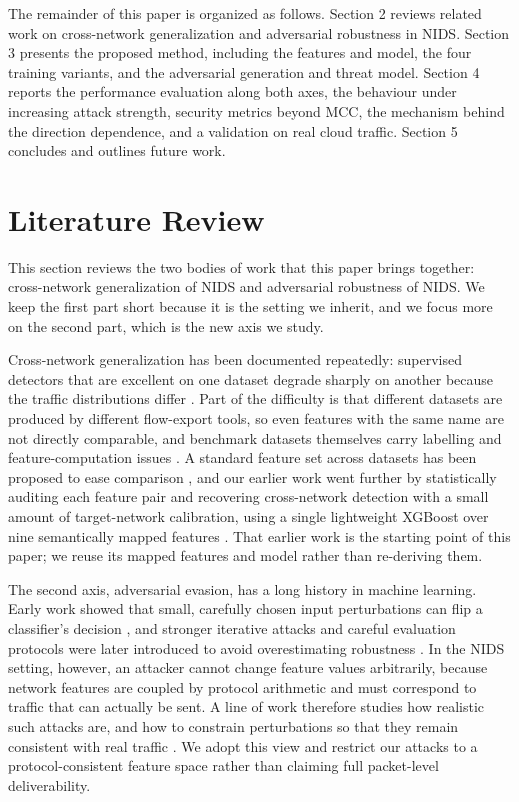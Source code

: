 \documentclass[11pt,a4paper]{article}
\begin{document}
The remainder of this paper is organized as follows. Section 2 reviews related work on
cross-network generalization and adversarial robustness in NIDS. Section 3 presents the
proposed method, including the features and model, the four training variants, and the
adversarial generation and threat model. Section 4 reports the performance evaluation
along both axes, the behaviour under increasing attack strength, security metrics beyond
MCC, the mechanism behind the direction dependence, and a validation on real cloud
traffic. Section 5 concludes and outlines future work.

\section{Literature Review}
This section reviews the two bodies of work that this paper brings together:
cross-network generalization of NIDS and adversarial robustness of NIDS. We keep the
first part short because it is the setting we inherit, and we focus more on the second
part, which is the new axis we study.

Cross-network generalization has been documented repeatedly: supervised detectors that
are excellent on one dataset degrade sharply on another because the traffic
distributions differ \cite{dhooge,verkerken,cantone}. Part of the difficulty is that
different datasets are produced by different flow-export tools, so even features with the
same name are not directly comparable, and benchmark datasets themselves carry labelling
and feature-computation issues \cite{layeghy}. A standard feature set across datasets has
been proposed to ease comparison \cite{sarhan}, and our earlier work went further by
statistically auditing each feature pair and recovering cross-network detection with a
small amount of target-network calibration, using a single lightweight XGBoost over nine
semantically mapped features \cite{xgboost,martono2024sfm}. That earlier work is the
starting point of this paper; we reuse its mapped features and model rather than
re-deriving them.

The second axis, adversarial evasion, has a long history in machine learning. Early work
showed that small, carefully chosen input perturbations can flip a classifier's decision
\cite{biggio2013,szegedy2014,goodfellow2015}, and stronger iterative attacks and careful
evaluation protocols were later introduced to avoid overestimating robustness
\cite{madry2018,carlini2017,athalye2018,carlini2019evaluating}. In the NIDS setting,
however, an attacker cannot change feature values arbitrarily, because network features
are coupled by protocol arithmetic and must correspond to traffic that can actually be
sent. A line of work therefore studies how realistic such attacks are, and how to
constrain perturbations so that they remain consistent with real traffic
\cite{apruzzese2023,merzouk2022,alhajjar2021,sheatsley2022,lin2022idsgan}. We adopt this
view and restrict our attacks to a protocol-consistent feature space rather than claiming
full packet-level deliverability.
\end{document}
